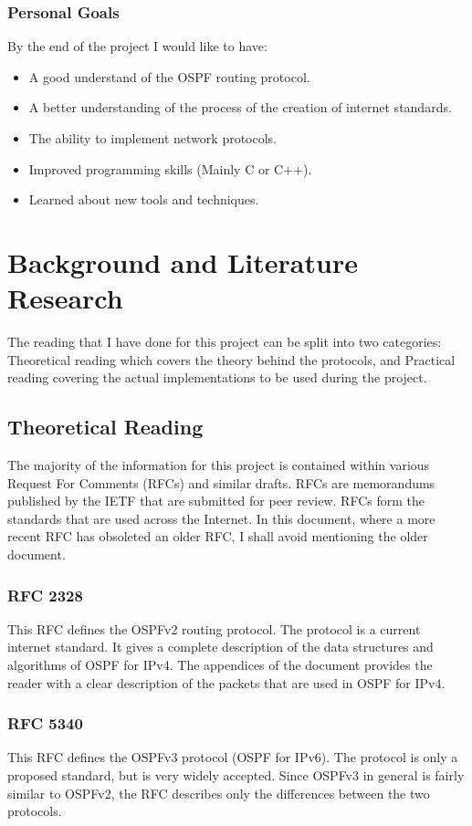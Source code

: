 \documentclass[12pt]{report}
\begin{document}
\subsection{Personal Goals}
By the end of the project I would like to have:

\begin{itemize}
	\item A good understand of the OSPF routing protocol.
	\item A better understanding of the process of the creation of internet
	standards.
	\item The ability to implement network protocols. 
	\item Improved programming skills (Mainly C or C++).
	\item Learned about new tools and techniques.
\end{itemize}

\chapter{Background and Literature Research}
The reading that I have done for this project can be split into two categories:
Theoretical reading which covers the theory behind the protocols, and Practical 
reading covering the actual implementations to be used during the project.

\section{Theoretical Reading}
The majority of the information for this project is contained within various
Request For Comments (RFCs)  and similar
drafts. RFCs are memorandums published by the IETF that are submitted for peer
review. RFCs form the standards that are used across the Internet. In this
document, where a more recent RFC has obsoleted an older RFC, I shall avoid
mentioning the older document. 

\subsection{RFC 2328} 
This RFC defines the OSPFv2 routing protocol\cite{rfc2328}. The protocol is a
current internet standard. It gives a complete description of the data
structures and algorithms of OSPF for IPv4. The appendices of the document
provides the reader with a clear description of the packets that are used in
OSPF for IPv4.

\subsection{RFC 5340}
This RFC defines the OSPFv3 protocol (OSPF for IPv6)\cite{rfc5340}. The protocol
is only a proposed standard, but is very widely accepted.  Since OSPFv3 in
general is fairly similar to OSPFv2, the RFC describes only the differences
between the two protocols. 
\end{document}
